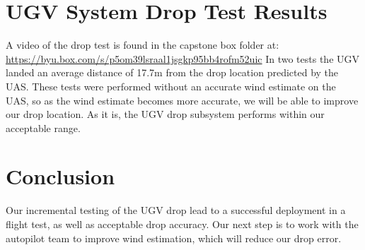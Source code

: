 \documentclass[]{auvsi_doc}
\begin{document}
\section*{UGV System Drop Test Results}
A video of the drop test is found in the capstone box folder at: \url{https://byu.box.com/s/p5om39lsraal1jsgkp95bb4rofm52uic}
In two tests the UGV landed an average distance of 17.7m from the drop location predicted by the UAS.
These tests were performed without an accurate wind estimate on the UAS, so as the wind estimate becomes more accurate, we will be able to improve our drop location.
As it is, the UGV drop subsystem performs within our acceptable range.

\section*{Conclusion}
Our incremental testing of the UGV drop lead to a successful deployment in a flight test, as well as acceptable drop accuracy. Our next step is to work with the autopilot team to improve wind estimation, which will reduce our drop error.
\end{document}
